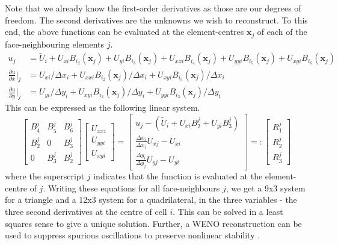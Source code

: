 \documentclass[11pt]{article}
\let\bld\boldsymbol
\begin{document}
Note that we already know the first-order derivatives as those are our degrees of freedom. The second derivatives are the unknowns we wish to reconstruct. To this end, the above functions can be evaluated at the element-centres $\bld{x}_j$ of each of the face-neighbouring elements $j$.
\begin{align}
u_j &= \tilde{U}_i + U_{xi}B_{i_2}(\bld{x}_j) + U_{yi}B_{i_3}(\bld{x}_j) + U_{xxi} B_{i_4}(\bld{x}_j) + U_{yyi} B_{i_5}(\bld{x}_j) + U_{xyi} B_{i_6}(\bld{x}_j) \\
\frac{\partial u}{\partial x}\Big|_j &= U_{xi}/\Delta x_i + U_{xxi} B_{i_2}(\bld{x}_j) / \Delta x_i + U_{xyi} B_{i_3}(\bld{x}_j) /\Delta x_i \\
\frac{\partial u}{\partial y}\Big|_j &= U_{yi}/\Delta y_i + U_{xyi} B_{i_2}(\bld{x}_j) / \Delta y_i + U_{yyi}B_{i_3}(\bld{x}_j)/\Delta y_i
\end{align}
This can be expressed as the following linear system.
\begin{equation}
\begin{bmatrix}
B_4^j & B_5^j & B_6^j \\
B_2^j & 0 & B_3^j \\
0 & B_3^j & B_2^j
\end{bmatrix}
\begin{bmatrix}
U_{xxi} \\ U_{yyi} \\ U_{xyi}
\end{bmatrix} =
\begin{bmatrix}
u_j - (\tilde{U}_i + U_{xi}B_2^j + U_{yi}B_3^j) \\
\frac{\Delta x_i}{\Delta x_j}U_{xj} - U_{xi} \\
\frac{\Delta y_i}{\Delta y_j}U_{yj} - U_{yi}
\end{bmatrix} =:
\begin{bmatrix}
R_1^j \\ R_2^j \\ R_3^j
\end{bmatrix}
\end{equation}
where the superscript $j$ indicates that the function is evaluated at the element-centre of $j$. Writing these equations for all face-neighbours $j$, we get a 9x3 system for a triangle and a 12x3 system for a quadrilateral, in the three variables - the three second derivatives at the centre of cell $i$. This can be solved in a least squares sense to give a unique solution. Further, a WENO reconstruction can be used to suppress spurious oscillations to preserve nonlinear stability \cite{luo_hweno}.
\end{document}
